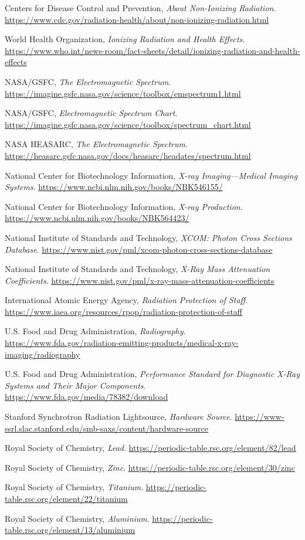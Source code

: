 \documentclass[12pt]{article}
\begin{document}
\begin{enumerate}[label={[\arabic*]}]
    \item Centers for Disease Control and Prevention, \textit{About Non-Ionizing Radiation}. \url{https://www.cdc.gov/radiation-health/about/non-ionizing-radiation.html}
    \item World Health Organization, \textit{Ionizing Radiation and Health Effects}. \url{https://www.who.int/news-room/fact-sheets/detail/ionizing-radiation-and-health-effects}
    \item NASA/GSFC, \textit{The Electromagnetic Spectrum}. \url{https://imagine.gsfc.nasa.gov/science/toolbox/emspectrum1.html}
    \item NASA/GSFC, \textit{Electromagnetic Spectrum Chart}. \url{https://imagine.gsfc.nasa.gov/science/toolbox/spectrum_chart.html}
    \item NASA HEASARC, \textit{The Electromagnetic Spectrum}. \url{https://heasarc.gsfc.nasa.gov/docs/heasarc/headates/spectrum.html}
    \item National Center for Biotechnology Information, \textit{X-ray Imaging---Medical Imaging Systems}. \url{https://www.ncbi.nlm.nih.gov/books/NBK546155/}
    \item National Center for Biotechnology Information, \textit{X-ray Production}. \url{https://www.ncbi.nlm.nih.gov/books/NBK564423/}
    \item National Institute of Standards and Technology, \textit{XCOM: Photon Cross Sections Database}. \url{https://www.nist.gov/pml/xcom-photon-cross-sections-database}
    \item National Institute of Standards and Technology, \textit{X-Ray Mass Attenuation Coefficients}. \url{https://www.nist.gov/pml/x-ray-mass-attenuation-coefficients}
    \item International Atomic Energy Agency, \textit{Radiation Protection of Staff}. \url{https://www.iaea.org/resources/rpop/radiation-protection-of-staff}
    \item U.S. Food and Drug Administration, \textit{Radiography}. \url{https://www.fda.gov/radiation-emitting-products/medical-x-ray-imaging/radiography}
    \item U.S. Food and Drug Administration, \textit{Performance Standard for Diagnostic X-Ray Systems and Their Major Components}. \url{https://www.fda.gov/media/78382/download}
    \item Stanford Synchrotron Radiation Lightsource, \textit{Hardware Source}. \url{https://www-ssrl.slac.stanford.edu/smb-saxs/content/hardware-source}
    \item Royal Society of Chemistry, \textit{Lead}. \url{https://periodic-table.rsc.org/element/82/lead}
    \item Royal Society of Chemistry, \textit{Zinc}. \url{https://periodic-table.rsc.org/element/30/zinc}
    \item Royal Society of Chemistry, \textit{Titanium}. \url{https://periodic-table.rsc.org/element/22/titanium}
    \item Royal Society of Chemistry, \textit{Aluminium}. \url{https://periodic-table.rsc.org/element/13/aluminium}
\end{enumerate}
\end{document}
